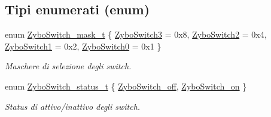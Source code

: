 \subsection*{Tipi enumerati (enum)}
\begin{DoxyCompactItemize}
\item 
enum \hyperlink{group___switch_ga2e0602a824354f25c395f938caba3703}{Zybo\+Switch\+\_\+mask\+\_\+t} \{ \hyperlink{group___switch_gga2e0602a824354f25c395f938caba3703a73ccea5ad8c919fe962e9a67a3733ee3}{Zybo\+Switch3} = 0x8, 
\hyperlink{group___switch_gga2e0602a824354f25c395f938caba3703aac2f5ebb28eb3bd93fcdf8019b6a3e9e}{Zybo\+Switch2} = 0x4, 
\hyperlink{group___switch_gga2e0602a824354f25c395f938caba3703a694a25c87b1ec597d2a6032bf5d34b0f}{Zybo\+Switch1} = 0x2, 
\hyperlink{group___switch_gga2e0602a824354f25c395f938caba3703a84350e8b6e7a7e2cabf22fc7a1a5c651}{Zybo\+Switch0} = 0x1
 \}
\begin{DoxyCompactList}\small\item\em Maschere di selezione degli switch. \end{DoxyCompactList}\item 
enum \hyperlink{group___switch_ga4ba6b49b2f47ebb464aefcea7e23e04a}{Zybo\+Switch\+\_\+status\+\_\+t} \{ \hyperlink{group___switch_gga4ba6b49b2f47ebb464aefcea7e23e04aa1d686faf83e8606e68eec0b7e525a755}{Zybo\+Switch\+\_\+off}, 
\hyperlink{group___switch_gga4ba6b49b2f47ebb464aefcea7e23e04aafba009508b8822de867af69034e3e4f8}{Zybo\+Switch\+\_\+on}
 \}
\begin{DoxyCompactList}\small\item\em Status di attivo/inattivo degli switch. \end{DoxyCompactList}\end{DoxyCompactItemize}
